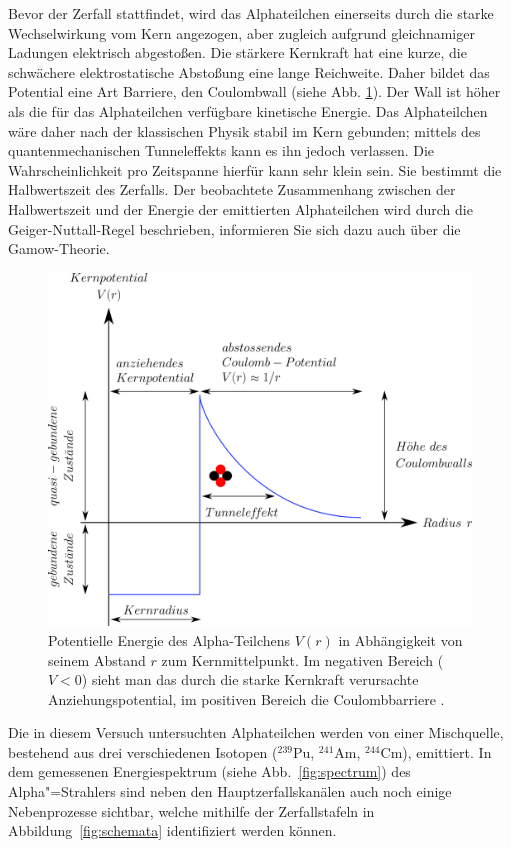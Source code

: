 Bevor der Zerfall stattfindet, wird das Alphateilchen einerseits durch die starke Wechselwirkung vom Kern angezogen, aber zugleich aufgrund gleichnamiger Ladungen elektrisch abgestoßen. Die stärkere Kernkraft hat eine kurze, die schwächere elektrostatische Abstoßung eine lange Reichweite. Daher bildet das Potential eine Art Barriere, den Coulombwall (siehe Abb. \ref{fig:coulomb-barriere}). Der Wall ist höher als die für das Alphateilchen verfügbare kinetische Energie. Das Alphateilchen wäre daher nach der klassischen Physik stabil im Kern gebunden; mittels des quantenmechanischen Tunneleffekts kann es ihn jedoch verlassen. Die Wahrscheinlichkeit pro Zeitspanne hierfür kann sehr klein sein. Sie bestimmt die Halbwertszeit des Zerfalls. Der beobachtete Zusammenhang zwischen der Halbwertszeit und der Energie der emittierten Alphateilchen wird durch die Geiger-Nuttall-Regel beschrieben, informieren Sie sich dazu auch über die Gamow-Theorie. \cite{dewiki:240085809}
\begin{figure}[h]
	\centering
	\includegraphics[width=0.6\linewidth]{img/Tunneleffekt_alpha_zerfall.png}
	\caption{Potentielle Energie des Alpha-Teilchens $V(r)$ in Abhängigkeit von seinem Abstand $r$ zum Kernmittelpunkt. Im negativen Bereich ($V<0$) sieht man das durch die starke Kernkraft verursachte Anziehungspotential, im positiven Bereich die Coulombbarriere \cite{img:coulombwall}.}
	\label{fig:coulomb-barriere}
\end{figure}
\newpage
Die in diesem Versuch untersuchten Alphateilchen werden von einer Mischquelle, bestehend aus drei verschiedenen Isotopen ($^{239}$Pu, $^{241}$Am, $^{244}$Cm), emittiert. In dem gemessenen Energiespektrum (siehe Abb.~\ref{fig:spectrum}) des Alpha"=Strahlers sind neben den Hauptzerfallskanälen auch noch einige Nebenprozesse sichtbar, welche mithilfe der Zerfallstafeln in Abbildung~\ref{fig:schemata} identifiziert werden können.

